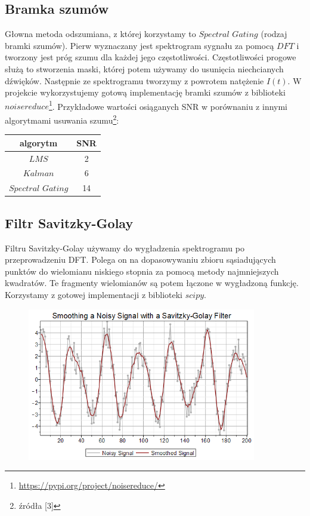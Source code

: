 \documentclass[polish]{article}
\begin{document}
\subsection{Bramka szumów}
Głowna metoda odszumiana, z której korzystamy to $Spectral$ $Gating$ (rodzaj bramki szumów).  Pierw wyznaczany jest spektrogram sygnału za pomocą $DFT$ i 
tworzony jest próg szumu dla każdej jego częstotliwości.
Częstotliwości progowe służą to stworzenia maski, której potem używamy do usunięcia niechcianych dźwięków.
Następnie ze spektrogramu tworzymy z powrotem natężenie $I(t)$. W projekcie wykorzystujemy gotową implementację bramki szumów z biblioteki $noisereduce$\footnote{\url{https://pypi.org/project/noisereduce/}}. Przykładowe wartości osiąganych SNR w porównaniu z innymi 
algorytmami usuwania szumu\footnote{źródła [3]}:
\begin{center}
\begin{tabular}{c  | c }
algorytm & SNR \\
\hline
$LMS$ & 2 \\
$Kalman$ & 6 \\
$Spectral$ $Gating$ & 14
\end{tabular}
\end{center}

\subsection{Filtr Savitzky-Golay}
Filtru Savitzky-Golay używamy do wygładzenia spektrogramu po przeprowadzeniu DFT.  Polega on na dopasowywaniu zbioru sąsiadujących punktów do wielomianu niskiego stopnia za pomocą metody najmniejszych kwadratów.
Te fragmenty wielomianów są potem łączone w wygładzoną funkcję. Korzystamy z gotowej implementacji
z biblioteki $scipy$.
\begin{figure}[H]
	\centering
	\includegraphics[width=10cm]{savitzky_golay_filter}
\end{figure}
\end{document}
